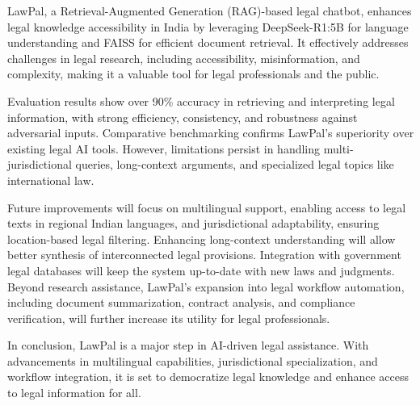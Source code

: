 LawPal, a Retrieval-Augmented Generation (RAG)-based legal chatbot, enhances legal knowledge accessibility in India by leveraging DeepSeek-R1:5B for language understanding and FAISS for efficient document retrieval. It effectively addresses challenges in legal research, including accessibility, misinformation, and complexity, making it a valuable tool for legal professionals and the public.  

Evaluation results show over 90\% accuracy in retrieving and interpreting legal information, with strong efficiency, consistency, and robustness against adversarial inputs. Comparative benchmarking confirms LawPal’s superiority over existing legal AI tools. However, limitations persist in handling multi-jurisdictional queries, long-context arguments, and specialized legal topics like international law.  

Future improvements will focus on multilingual support, enabling access to legal texts in regional Indian languages, and jurisdictional adaptability, ensuring location-based legal filtering. Enhancing long-context understanding will allow better synthesis of interconnected legal provisions. Integration with government legal databases will keep the system up-to-date with new laws and judgments. Beyond research assistance, LawPal’s expansion into legal workflow automation, including document summarization, contract analysis, and compliance verification, will further increase its utility for legal professionals.  

In conclusion, LawPal is a major step in AI-driven legal assistance. With advancements in multilingual capabilities, jurisdictional specialization, and workflow integration, it is set to democratize legal knowledge and enhance access to legal information for all.